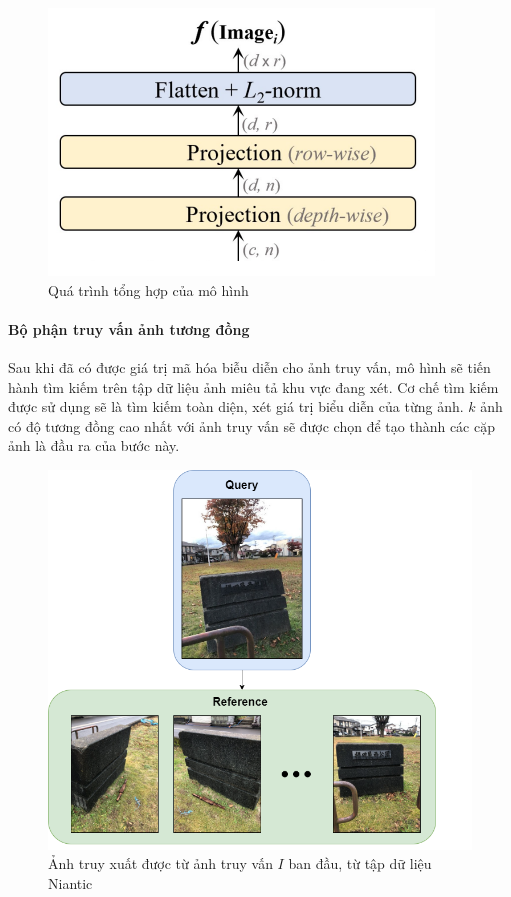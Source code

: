 \begin{figure}[H]
    \centering
    \includegraphics[scale=0.75]{pics/Proposal/proj-agg.png}
    \caption{Quá trình tổng hợp của mô hình \cite{alibey2023mixvpr}}
\end{figure}

\paragraph*{Bộ phận truy vấn ảnh tương đồng}

Sau khi đã có được giá trị mã hóa biễu diễn cho ảnh truy vấn, mô hình sẽ tiến hành tìm kiếm trên tập dữ liệu ảnh miêu tả khu vực đang xét. Cơ chế tìm kiếm được sử dụng sẽ là tìm kiếm toàn diện, xét giá trị biểu diễn của từng ảnh. $k$ ảnh có độ tương đồng cao nhất với ảnh truy vấn sẽ được chọn để tạo thành các cặp ảnh là đầu ra của bước này.

\begin{figure}[H]
    \centering
    \includegraphics[scale=0.5]{pics/Proposal/query.png}
    \caption[Kết quả của module VPR]{Ảnh truy xuất được từ ảnh truy vấn $I$ ban đầu, từ tập dữ liệu Niantic \cite{arnold2022mapfree}}
\end{figure}

